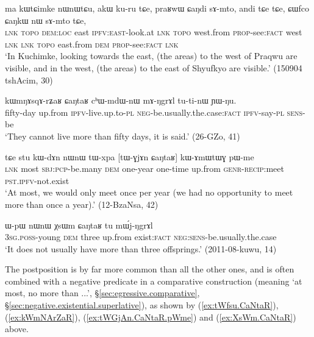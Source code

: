 \begin{exe}
\ex \label{ex:praRwW.CaNdi}
 \gll ma kɯtɕimke nɯnɯtɕu, akɯ ku-ru tɕe, praʁwɯ ɕaŋdi sɤ-mto, 
andi tɕe tɕe, ɕɯfco ɕaŋkɯ nɯ sɤ-mto tɕe, \\
\textsc{lnk}  \textsc{topo} \textsc{dem}:\textsc{loc} east \textsc{ipfv}:\textsc{east}-look.at \textsc{lnk}  \textsc{topo} west.from \textsc{prop}-see:\textsc{fact} west \textsc{lnk} \textsc{lnk}  \textsc{topo} east.from \textsc{dem} \textsc{prop}-see:\textsc{fact} \textsc{lnk} \\
\glt `In Kuchimke, looking towards the east, (the areas) to the west of Praqwu are visible, and in the west, (the areas) to the east of Shyufkyo are visible.' (150904 tshAcim, 30)
\end{exe}

\begin{exe}
\ex \label{ex:kWmNArZaR}
 \gll kɯmŋɤsqɤ-rʑaʁ ɕaŋtaʁ cʰɯ-mdɯ-nɯ mɤ-ŋgrɤl tu-ti-nɯ ɲɯ-ŋu.  \\
 fifty-day up.from \textsc{ipfv}-live.up.to-\textsc{pl} \textsc{neg}-be.usually.the.case:\textsc{fact} \textsc{ipfv}-say-\textsc{pl} \textsc{sens}-be \\
\glt `They cannot live more than fifty days, it is said.' (26-GZo, 41)
\end{exe}

\begin{exe}
\ex \label{ex:tWGjAn.CaNtaR.pWme}
 \gll tɕe stu kɯ-dɤn nɯnɯ tɯ-xpa [tɯ-ɣjɤn ɕaŋtaʁ] kɯ-ɤmɯtɯɣ pɯ-me \\
 \textsc{lnk} most \textsc{sbj}:\textsc{pcp}-be.many \textsc{dem} one-year one-time up.from \textsc{genr}-\textsc{recip}:meet \textsc{pst}.\textsc{ipfv}-not.exist \\
 \glt `At most, we would only meet once per year (we had no opportunity to meet more than once a year).' (12-BzaNsa, 42)
 \end{exe}

\begin{exe}
\ex \label{ex:XsWm.CaNtaR}
 \gll ɯ-pɯ nɯnɯ χsɯm ɕaŋtaʁ tu mɯ́j-ŋgrɤl\\
\textsc{3sg}.\textsc{poss}-young \textsc{dem} three up.from exist:\textsc{fact} \textsc{neg}:\textsc{sens}-be.usually.the.case\\
\glt `It does not usually have more than three offsprings.' (2011-08-kuwu, 14)
\end{exe}

The postposition  is by far more common than all the other ones, and is often combined with a negative predicate in a comparative construction (meaning `at most, no more than ...', §\ref{sec:egressive.comparative}, §\ref{sec:negative.existential.superlative}), as shown by (\ref{ex:tWfsu.CaNtaR}), (\ref{ex:kWmNArZaR}), (\ref{ex:tWGjAn.CaNtaR.pWme}) and (\ref{ex:XsWm.CaNtaR}) above. 


